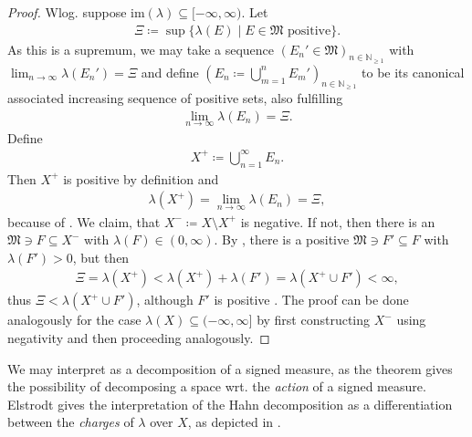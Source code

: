 \documentclass[10pt, leqno]{amsart}
\theoremstyle{definition}
\theoremstyle{remark}
\begin{document}
    \begin{proof}
        Wlog. suppose \(\text{im}(\lambda) \subseteq [-\infty, \infty)\). Let
        \begin{align}
            \Xi \coloneqq \sup\{\lambda(E) \mid E \in \mathfrak{M} \text{ positive}\}.
        \end{align}
        As this is a supremum, we may take a sequence \((E_n' \in \mathfrak{M})_{n \in \mathbb{N}_{\geq 1}}\) with \(\lim_{n \to \infty} \lambda(E_n') = \Xi\) and define \((E_n \coloneqq \bigcup_{m=1}^n E_m')_{n \in \mathbb{N}_{\geq 1}}\) to be its canonical associated increasing sequence of positive sets, also fulfilling
        \begin{align}
            \lim_{n \to \infty} \lambda(E_n) = \Xi.
        \end{align}
        Define
        \begin{align}
            X^+ \coloneqq \bigcup_{n=1}^\infty E_n.
        \end{align}
        Then \(X^+\) is positive by definition and
        \begin{align}
            \lambda(X^+) = \lim_{n \to \infty} \lambda(E_n) = \Xi,
        \end{align}
        because of . We claim, that \(X^- \coloneqq X \setminus X^+\) is negative. If not, then there is an \(\mathfrak{M} \ni F \subseteq X^-\) with \(\lambda(F) \in (0, \infty)\). By , there is a positive \(\mathfrak{M} \ni F' \subseteq F\) with \(\lambda(F') > 0\), but then
        \begin{align}
            \Xi = \lambda(X^+) < \lambda(X^+) + \lambda(F') = \lambda(X^+ \cup F') < \infty,
        \end{align}
        thus \(\Xi < \lambda(X^+ \cup F')\), although \(F'\) is positive \lightning. The proof can be done analogously for the case \(\lambda(X) \subseteq (-\infty, \infty]\) by first constructing \(X^-\) using negativity and then proceeding analogously.
    \end{proof}

    We may interpret  as a decomposition of a signed measure, as the theorem gives the possibility of decomposing a space wrt. the \emph{action} of a signed measure. Elstrodt \cite[p. 271]{Elstrodt} gives the interpretation of the Hahn decomposition as a differentiation between the \emph{charges} of \(\lambda\) over \(X\), as depicted in .
\end{document}
